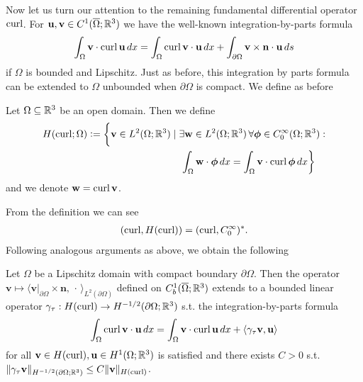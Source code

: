 \documentclass[../master_thesis.tex]{subfiles}
\begin{document}
Now let us turn our attention to the remaining fundamental differential operator 
$\operatorname{curl}$. For 
$\mathbf{u}, \mathbf{v} \in C^1(\overline{\Omega};\mathbb{R}^3)$ we have the well-known integration-by-parts 
formula
\begin{align}
    \int_\Omega \mathbf{v} \cdot \curl \mathbf{u} \, dx 
    = \int_\Omega \curl \mathbf{v} \cdot \mathbf{u} \, dx 
        + \int_{\partial \Omega} \mathbf{v} \times \mathbf{n} \cdot \mathbf{u} \, ds 
        \label{eq:integration_by_parts_curl_C1} 
\end{align}
if $\Omega$ is bounded and Lipschitz. Just as before, this integration by parts formula can 
be extended to $\Omega$ unbounded when $\partial \Omega$ is compact. 
We define as before 
\begin{definition}
    Let $\Omega \subseteq \mathbb{R}^3$ be an open domain. 
    Then we define 
    \begin{align*}
        H(\operatorname{curl};\Omega) \vcentcolon= \bigg\{ \mathbf{v} \in L^2(\Omega;\mathbb{R}^3)
        &\mid \exists \mathbf{w} \in L^2(\Omega; \mathbb{R}^3) 
        \,\forall \boldsymbol{\phi} \in C_0^\infty(\Omega;\mathbb{R}^3):
        \\ &\quad \int_\Omega \mathbf{w} \cdot \boldsymbol{\phi} \, dx 
        = \int_\Omega \mathbf{v} \cdot \operatorname{curl} \boldsymbol{\phi} \, dx \bigg\}
    \end{align*}
    and we denote $\mathbf{w} = \operatorname{curl} \mathbf{v}$.
\end{definition}
From the definition we can see
\begin{align*}
    (\operatorname{curl}, H(\operatorname{curl})) = (\operatorname{curl}, C_0^\infty)^*.
\end{align*}
Following analogous arguments as above, we obtain the following 
\begin{theorem}\label{thm:trace_hcurl}
    Let $\Omega$ be a Lipschitz domain with compact boundary $\partial \Omega$.
    Then the operator $\mathbf{v} \mapsto 
    \langle \mathbf{v}|_{\partial \Omega} \times \mathbf{n}, \,\cdot\, \rangle_{L^2(\partial \Omega)}$ 
    defined on $C^1_b(\overline{\Omega};\mathbb{R}^3)$ extends to a bounded linear operator 
    $\gamma_\tau: H(\operatorname{curl}) \rightarrow H^{-1/2}(\partial \Omega; \mathbb{R}^3)$ 
    s.t. the integration-by-parts formula 
    \begin{align*}
        \int_\Omega \operatorname{curl} \mathbf{v} \cdot \mathbf{u} \, dx = 
            \int_\Omega \mathbf{v} \cdot \operatorname{curl} \mathbf{u} \, dx
            + \langle \gamma_\tau \mathbf{v}, \mathbf{u} \rangle
    \end{align*}
    for all $\mathbf{v} \in H(\operatorname{curl}), \mathbf{u} \in H^1(\Omega;\mathbb{R}^3)$
    is satisfied and there exists $C>0$ s.t.
    $\lVert \gamma_\tau \mathbf{v} \rVert _{H^{-1/2}(\partial \Omega; \mathbb{R}^3)} 
    \leq C \lVert \mathbf{v} \rVert _{H(\operatorname{curl})}$. 
\end{theorem}
\end{document}
